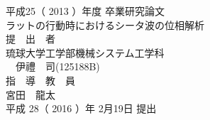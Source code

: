 \makeatletter
\makeatother
\thispagestyle{empty}
\setcounter{page}{0}

\begin{center}
平成25（ 2013 ）年度 卒業研究論文\\
\vspace{1.5cm}
{\LARGE \mbox{ラットの行動時におけるシータ波の位相解析}} \\
\vspace{2.0cm}
提~~出~~者\\
\vspace{1.5cm}
{\Large 琉球大学工学部機械システム工学科}\\
\vspace{1.5cm}
{\Large　伊禮　司(125188B)}\\
\vspace{2.0cm}
指~~導~~教~~員\\
\vspace{0.5cm}
宮田　龍太\\
\vspace{1.5cm}
平成 28（ 2016 ）年 2月19日  提出\\
\end{center}
\setlength{\baselineskip}{8mm}
\setlength{\headheight}{-1.5cm}
\def\thepage{\roman{page}}
\newpage
